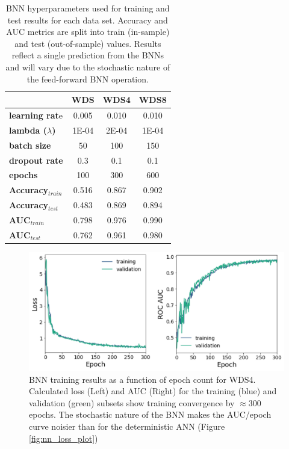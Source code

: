 \begin{table}[htp]
\centering
\begin{tabular}{l|c|c|c|}
\cline{2-4}
                                      & \textbf{WDS}   & \textbf{WDS4}  & \textbf{WDS8}  \\ \hline
\multicolumn{1}{|l|}{\textbf{learning rat}e}   & 0.005 & 0.010 & 0.010 \\ \hline
\multicolumn{1}{|l|}{\textbf{lambda ($\lambda$)}} & 1E-04 & 2E-04 & 1E-04 \\ \hline
\multicolumn{1}{|l|}{\textbf{batch size}}      & 50    & 100   & 150   \\ \hline
\multicolumn{1}{|l|}{\textbf{dropout rate}}    & 0.3   & 0.1   & 0.1   \\ \hline
\multicolumn{1}{|l|}{\textbf{epochs}}          & 100   & 300   & 600   \\ \hline
\multicolumn{1}{|l|}{\textbf{Accuracy$_{train}$}} & 0.516 & 0.867 & 0.902 \\ \hline
\multicolumn{1}{|l|}{\textbf{Accuracy$_{test}$}}  & 0.483 & 0.869 & 0.894 \\ \hline
\multicolumn{1}{|l|}{\textbf{AUC$_{train}$}}      & 0.798 & 0.976 & 0.990 \\ \hline
\multicolumn{1}{|l|}{\textbf{AUC$_{test}$}}       & 0.762 & 0.961 & 0.980 \\ \hline
\end{tabular}
\singlespacing
\caption[Bayesian neural network single-run metrics]{BNN hyperparameters used for training and test results for each data set. Accuracy and AUC metrics are split into train (in-sample) and test (out-of-sample) values. Results reflect a single prediction from the BNNs and will vary due to the stochastic nature of the feed-forward BNN operation.}
\label{tab:bnn_metrics}
\end{table}

\begin{figure}%
\centering
\includegraphics[width=\textwidth]{templates/images/Figure-BNN_Loss_AUC_WDS4.png}
\caption[Bayesian neural network training loss]{BNN training results as a function of epoch count for WDS4. Calculated loss (Left) and AUC (Right) for the training (blue) and validation (green) subsets show training convergence by $\approx 300$ epochs. The stochastic nature of the BNN makes the AUC/epoch curve noisier than for the deterministic ANN (Figure \ref{fig:nn_loss_plot})}
\label{fig:bnn_loss}
\end{figure}

